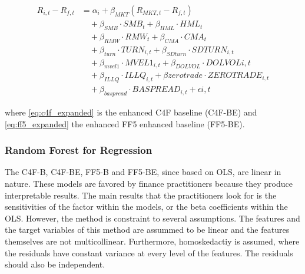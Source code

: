 \begin{equation}
    \label{eq:ff5_expanded}
    \begin{split}
    R_{i,t} - R_{f,t} &= \alpha_i + \beta_{MKT} (R_{MKT,t} - R_{f,t}) \\
    &\quad + \beta_{SMB} \cdot SMB_t + \beta_{HML} \cdot HML_t \\
    &\quad + \beta_{RMW} \cdot RMW_t + \beta_{CMA} \cdot CMA_t\\
    &\quad + \beta_{turn} \cdot TURN_{i,t} + \beta_{SDturn} \cdot SDTURN_{i,t} \\
    &\quad + \beta_{mvel1} \cdot MVEL1_{i,t} + \beta_{DOLVOL} \cdot DOLVOL{i,t} \\
    &\quad + \beta_{ILLQ} \cdot ILLQ_{i,t} + \beta{zerotrade} \cdot ZEROTRADE_{i,t} \\
    &\quad + \beta_{baspread} \cdot BASPREAD_{i,t} + \epsilon{i,t}
    \end{split}
\end{equation}

where \cref{eq:c4f_expanded} is the enhanced C4F baseline (C4F-BE) and \cref{eq:ff5_expanded} the enhanced FF5 enhanced baseline (FF5-BE). 



\subsubsection{Random Forest for Regression}



The C4F-B, C4F-BE, FF5-B and FF5-BE, since based on OLS, are linear in nature. These models are favored by finance practitioners because they produce interpretable results. The main results that the practitioners look for is the sensitivities of the factor within the models, or the beta coefficients within the OLS. However, the method is constraint to several assumptions. The features and the target variables of this method are assummed to be linear and the features themselves are not multicollinear. Furthermore, homoskedactiy is assumed, where the residuals have constant variance at every level of the features. The residuals should also be independent.

